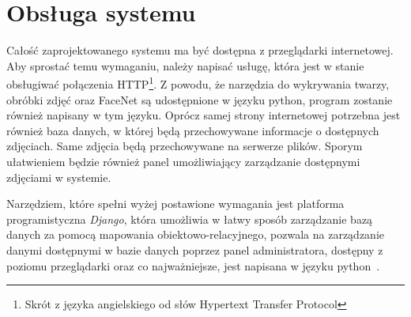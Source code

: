 \section{Obsługa systemu}

Całość zaprojektowanego systemu ma być dostępna z przeglądarki internetowej.
Aby sprostać temu wymaganiu, należy napisać usługę, która jest w stanie obsługiwać połączenia
HTTP\footnote{Skrót z języka angielskiego od słów Hypertext Transfer Protocol}.
Z powodu, że narzędzia do wykrywania twarzy, obróbki zdjęć oraz FaceNet są udostępnione w języku python,
program zostanie również napisany w tym języku.
Oprócz samej strony internetowej potrzebna jest również baza danych,
w której będą przechowywane informacje o dostępnych zdjęciach.
Same zdjęcia będą przechowywane na serwerze plików.
Sporym ułatwieniem będzie również panel umożliwiający zarządzanie dostępnymi zdjęciami w systemie.

Narzędziem, które spełni wyżej postawione wymagania jest platforma programistyczna \textit{Django},
która umożliwia w łatwy sposób zarządzanie bazą danych za pomocą mapowania obiektowo-relacyjnego,
pozwala na zarządzanie danymi dostępnymi w bazie danych poprzez panel administratora, dostępny
z poziomu przeglądarki oraz co najważniejsze, jest napisana w języku python~\cite{djangodoc}.